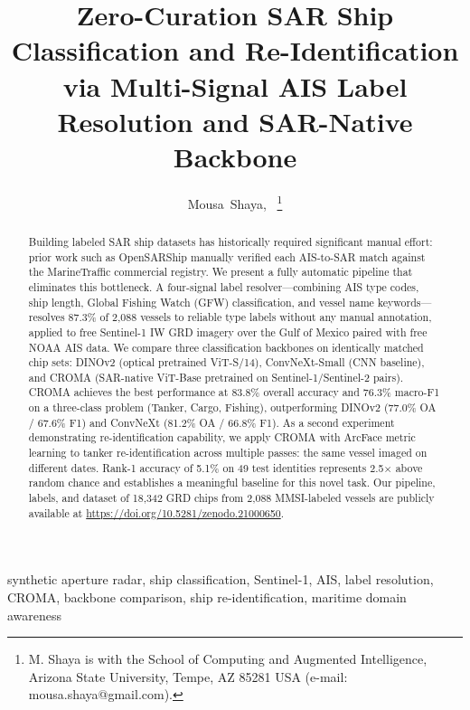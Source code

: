 \documentclass[journal]{IEEEtran}
\begin{document}
\title{Zero-Curation SAR Ship Classification and Re-Identification\\
via Multi-Signal AIS Label Resolution and SAR-Native Backbone}

\author{Mousa~Shaya,~\IEEEmembership{}
\thanks{M. Shaya is with the School of Computing and Augmented Intelligence,
Arizona State University, Tempe, AZ 85281 USA (e-mail: mousa.shaya@gmail.com).}}

\maketitle

\begin{abstract}
Building labeled SAR ship datasets has historically required significant
manual effort: prior work such as OpenSARShip manually verified each
AIS-to-SAR match against the MarineTraffic commercial registry.
We present a fully automatic pipeline that eliminates this bottleneck.
A four-signal label resolver---combining AIS type codes, ship length,
Global Fishing Watch (GFW) classification, and vessel name keywords---
resolves 87.3\% of 2,088 vessels to reliable type labels without any
manual annotation, applied to free Sentinel-1 IW GRD imagery over the
Gulf of Mexico paired with free NOAA AIS data.
We compare three classification backbones on identically matched chip sets:
DINOv2 (optical pretrained ViT-S/14), ConvNeXt-Small (CNN baseline),
and CROMA (SAR-native ViT-Base pretrained on Sentinel-1/Sentinel-2 pairs).
CROMA achieves the best performance at 83.8\% overall accuracy and 76.3\%
macro-F1 on a three-class problem (Tanker, Cargo, Fishing), outperforming
DINOv2 (77.0\% OA / 67.6\% F1) and ConvNeXt (81.2\% OA / 66.8\% F1).
As a second experiment demonstrating re-identification capability,
we apply CROMA with ArcFace metric learning to tanker re-identification
across multiple passes: the same vessel imaged on different dates.
Rank-1 accuracy of 5.1\% on 49 test identities represents 2.5$\times$
above random chance and establishes a meaningful baseline for this novel
task.
Our pipeline, labels, and dataset of 18,342 GRD chips from 2,088
MMSI-labeled vessels are publicly available at
\url{https://doi.org/10.5281/zenodo.21000650}.
\end{abstract}

\begin{IEEEkeywords}
synthetic aperture radar, ship classification, Sentinel-1, AIS, label
resolution, CROMA, backbone comparison, ship re-identification, maritime
domain awareness
\end{IEEEkeywords}
\end{document}
